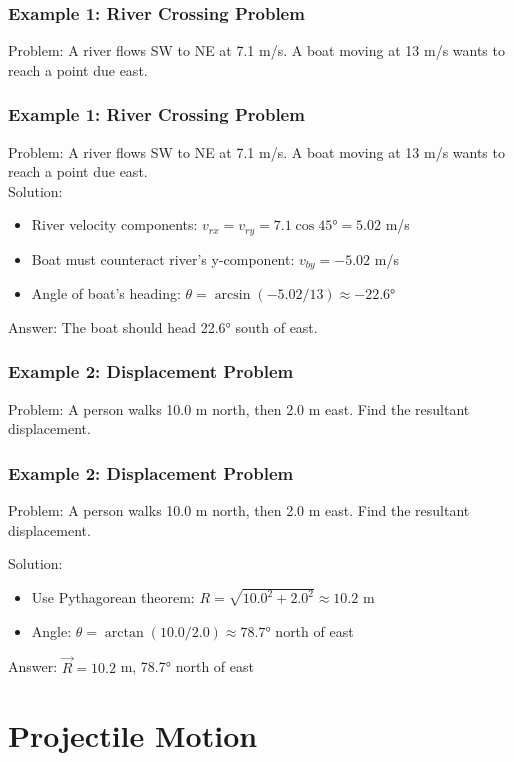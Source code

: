 \documentclass{beamer}
\begin{document}
\begin{frame}
\frametitle{Example 1: River Crossing Problem}
Problem: A river flows SW to NE at 7.1 m/s. A boat moving at 13 m/s wants to reach a point due east.


\end{frame}
\begin{frame}
\frametitle{Example 1: River Crossing Problem}
Problem: A river flows SW to NE at 7.1 m/s. A boat moving at 13 m/s wants to reach a point due east.\\

Solution:
\begin{itemize}
    \item River velocity components: $v_{rx} = v_{ry} = 7.1\cos45° = 5.02$ m/s
    \item Boat must counteract river's y-component: $v_{by} = -5.02$ m/s
    \item Angle of boat's heading: $\theta = \arcsin(-5.02/13) \approx -22.6°$
\end{itemize}
Answer: The boat should head 22.6° south of east.
\end{frame}

\begin{frame}
\frametitle{Example 2: Displacement Problem}
Problem: A person walks 10.0 m north, then 2.0 m east. Find the resultant displacement.

\end{frame}

\begin{frame}
\frametitle{Example 2: Displacement Problem}
Problem: A person walks 10.0 m north, then 2.0 m east. Find the resultant displacement.

Solution:
\begin{itemize}
    \item Use Pythagorean theorem: $R = \sqrt{10.0^2 + 2.0^2} \approx 10.2$ m
    \item Angle: $\theta = \arctan(10.0/2.0) \approx 78.7°$ north of east
\end{itemize}
Answer: $\vec{R} = 10.2$ m, 78.7° north of east
\end{frame}
\section{Projectile Motion}
\end{document}
